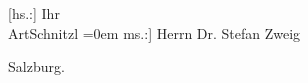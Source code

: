 \pstart
           {[}hs.:{]} Ihr{\\[\baselineskip]}\spacefill\mbox{ArtSchnitzl}\pend
           \leftskip=0em{}
\pstart
           \noindent{}{[}ms.:{]} Herrn Dr. Stefan Zweig\pend
           
\pstart
           \noindent{}Salzburg.\pend
           \endnumbering{}  \newcommand{\dateiname}{L03743}\newcommand{\titel}{Arthur Schnitzler an Stefan Zweig, 4. 7. 1929}\newcommand{\editorInnen}{Selma Jahnke und Martin Anton Müller}
